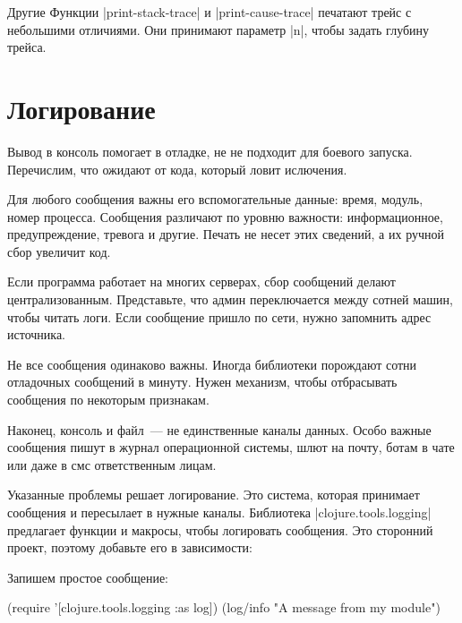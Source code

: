 Другие Функции \spverb|print-stack-trace| и \spverb|print-cause-trace| печатают
трейс с небольшими отличиями. Они принимают параметр \spverb|n|, чтобы задать
глубину трейса.

\section{Логирование}

Вывод в консоль помогает в отладке, не не подходит для боевого
запуска. Перечислим, что ожидают от кода, который ловит ислючения.

Для любого сообщения важны его вспомогательные данные: время, модуль, номер
процесса. Сообщения различают по уровню важности: информационное,
предупреждение, тревога и другие. Печать не несет этих сведений, а их ручной
сбор увеличит код.

Если программа работает на многих серверах, сбор сообщений делают
централизованным. Представьте, что админ переключается между сотней машин, чтобы
читать логи. Если сообщение пришло по сети, нужно запомнить адрес источника.

Не все сообщения одинаково важны. Иногда библиотеки порождают сотни отладочных
сообщений в минуту. Нужен механизм, чтобы отбрасывать сообщения по некоторым
признакам.

Наконец, консоль и файл~--- не единственные каналы данных. Особо важные
сообщения пишут в журнал операционной системы, шлют на почту, ботам в чате или
даже в смс ответственным лицам.

Указанные проблемы решает логирование. Это система, которая принимает сообщения
и пересылает в нужные каналы. Библиотека \spverb|clojure.tools.logging|
предлагает функции и макросы, чтобы логировать сообщения. Это сторонний проект,
поэтому добавьте его в зависимости:

\begin{english}
  \begin{clojure}
  \end{clojure}
\end{english}

\noindent
Запишем простое сообщение:

\begin{english}
  \begin{clojure}
(require '[clojure.tools.logging :as log])
(log/info "A message from my module")
  \end{clojure}
\end{english}

